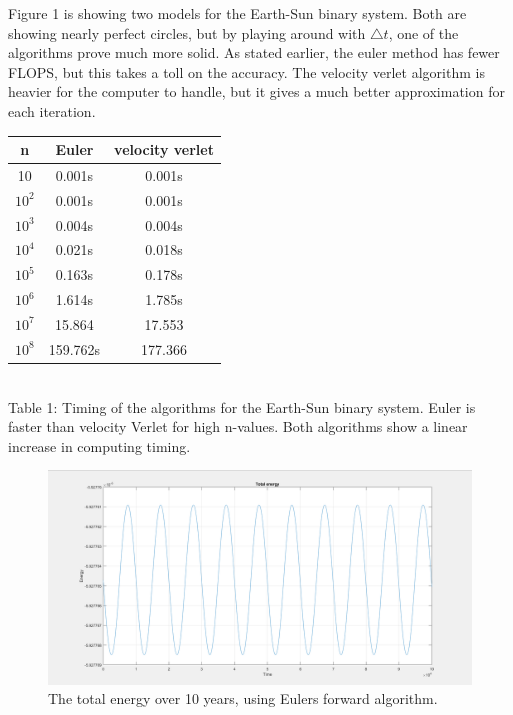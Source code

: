 \documentclass[10pt,a4paper]{article}
\begin{document}
\noindent Figure 1 is showing  two models for the Earth-Sun binary system. Both are showing nearly perfect circles, but by playing around with $\bigtriangleup t$, one of the algorithms prove much more solid. As stated earlier, the euler method has fewer FLOPS, but this takes a toll on the accuracy. The velocity verlet algorithm is heavier for the computer to handle, but it gives a much better approximation for each iteration. \\ 

\begin{center}
\begin{tabular}{|c|c|c|}
\hline
  n  & Euler & velocity verlet\\
\hline
10        & 0.001s & 0.001s \\
\hline
$10^2$      & 0.001s & 0.001s \\
\hline
$10^3$      & 0.004s & 0.004s \\
\hline
$10^4$      & 0.021s & 0.018s \\
\hline
$10^5$      & 0.163s & 0.178s \\
\hline
$10^6$      & 1.614s & 1.785s \\
\hline
$10^7$      & 15.864 & 17.553 \\
\hline
$10^8$      & 159.762s & 177.366  \\
\hline
\end{tabular}\\
Table 1: Timing of the algorithms for the Earth-Sun binary system. Euler is faster than velocity Verlet for high n-values. Both algorithms show a linear increase in computing timing. 
\end{center}



\begin{figure} [H]

\centerline{\includegraphics[scale=0.30]{TotalEnergyVerlet.png}}
\caption{The total energy over 10 years, using Eulers forward algorithm. }


\end{figure}
\end{document}
